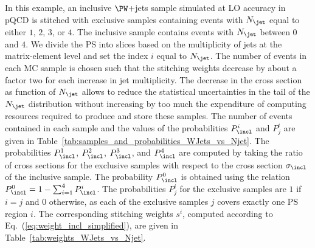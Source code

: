 In this example, an inclusive $\PW$+jets sample simulated at LO accuracy in pQCD 
is stitched with exclusive samples containing events with $N_{\jet}$ equal to either $1$, $2$, $3$, or $4$.
The inclusive sample contains events with $N_{\jet}$ between $0$ and $4$.
We divide the PS into slices based on the multiplicity of jets at the matrix-element level and set the index $i$ equal to $N_{\jet}$.
The number of events in each MC sample is chosen such that the stitching weights decrease by about a factor two for each increase in jet multiplicity.
The decrease in the cross section as function of $N_{\jet}$
allows to reduce the statistical uncertainties in the tail of the $N_{\jet}$ distribution
without increasing by too much the expenditure of computing resources required to produce and store these samples.
The number of events contained in each sample and the values of the probabilities $P_{\incl}^{i}$ and $P_{j}^{i}$ are given in Table~\ref{tab:samples_and_probabilities_WJets_vs_Njet}.
The probabilities $P_{\incl}^{1}$, $P_{\incl}^{2}$, $P_{\incl}^{3}$, and $P_{\incl}^{4}$ are computed by taking the ratio of cross sections 
for the exclusive samples with respect to the cross section $\sigma_{\incl}$ of the inclusive sample.
The probability $P_{\incl}^{0}$ is obtained using the relation $P_{\incl}^{0} = 1 - \sum_{i=1}^{4} P_{\incl}^{i}$.
The probabilities $P_{j}^{i}$ for the exclusive samples are $1$ if $i=j$ and $0$ otherwise,
as each of the exclusive samples $j$ covers exactly one PS region $i$.
The corresponding stitching weights $s^{i}$, computed according to Eq.~(\ref{eq:weight_incl_simplified}), are given in Table~\ref{tab:weights_WJets_vs_Njet}.

